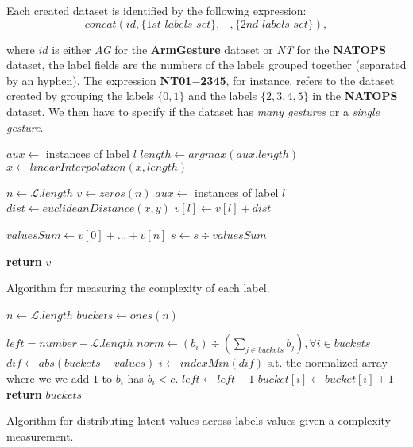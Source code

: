 \documentclass[10pt, conference]{IEEEtran}
\begin{document}
Each created dataset is identified by the following expression:
$$  concat(id,\{1st\_labels\_set\},-,\{2nd\_labels\_set\}), $$

\noindent where $id$ is either \textit{AG} for the \textbf{ArmGesture} dataset or \textit{NT} for the \textbf{NATOPS} dataset, the label fields are the numbers of the labels grouped together (separated by an hyphen). 
The expression \textbf{NT01$-$2345}, for instance, refers to the dataset created by grouping the labels $\{0,1\}$ and the labels $\{2,3,4,5\}$ in the \textbf{NATOPS} dataset. We then have to specify if the dataset has \textit{many gestures} or a \textit{single gesture}.



\begin{algorithm}[t]
\begin{algorithmic}[1]

\State $aux \gets$ instances of label $l$ 
\State $length\gets argmax(aux.length)$
\State $x\gets linearInterpolation(x,length)$
\EndFor
\EndFor


\State $n \gets \mathcal{L}.length$
\State $v \gets zeros(n)$
\State $aux \gets$ instances of label $l$ 
\State $dist \gets euclideanDistance(x,y)$ 
\State $v[l] \gets v[l] + dist$
\EndFor
\EndFor

\State $valuesSum \gets v[0] + ... + v[n]$
\State $s\gets s \div valuesSum$
\EndFor

\State \textbf{return} $v$
\EndProcedure
\end{algorithmic}
\caption{Algorithm for measuring the complexity of each label.}\label{measure}
\end{algorithm}

\begin{algorithm}[t]

\begin{algorithmic}[1]

\State $n \gets \mathcal{L}.length$
\State $buckets \gets ones(n)$


\State $left = number - \mathcal{L}.length$
\State $norm \gets (b_i) \div (\sum \limits_{j \in buckets} b_j), \forall i \in  buckets$
\State $dif \gets abs(buckets - values)$
\State $i \gets indexMin(dif)$ s.t. the normalized array where we we add $1$ to $b_i$ has $b_i < c$.
\State $left \gets left -1$
\State $bucket[i] \gets bucket[i] + 1$
\EndWhile
\State \textbf{return} $buckets$
\EndProcedure
\end{algorithmic}
\caption{Algorithm for distributing latent values across labels values given a complexity measurement.}\label{dist}
\end{algorithm}
\end{document}
